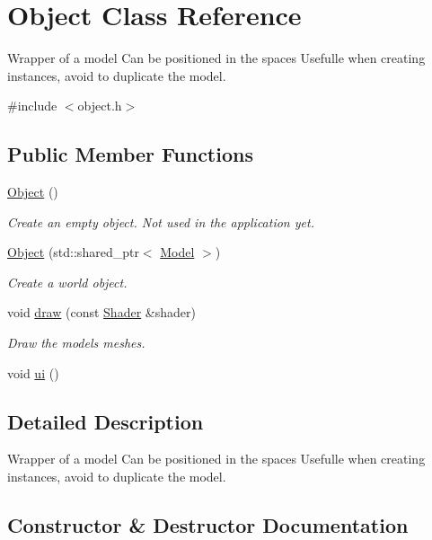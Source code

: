\hypertarget{classObject}{}\section{Object Class Reference}
\label{classObject}


Wrapper of a model Can be positioned in the spaces Usefulle when creating instances, avoid to duplicate the model.  




{\ttfamily \#include $<$object.\+h$>$}

\subsection*{Public Member Functions}
\begin{DoxyCompactItemize}
\item 
\hyperlink{classObject_a40860402e64d8008fb42329df7097cdb}{Object} ()
\begin{DoxyCompactList}\small\item\em Create an empty object. Not used in the application yet. \end{DoxyCompactList}\item 
\hyperlink{classObject_a30ff0733f6b70bc1037d58b927237a0c}{Object} (std\+::shared\+\_\+ptr$<$ \hyperlink{classModel}{Model} $>$)
\begin{DoxyCompactList}\small\item\em Create a world object. \end{DoxyCompactList}\item 
void \hyperlink{classObject_ad9684af664b6b318174bb147d88131fe}{draw} (const \hyperlink{classShader}{Shader} \&shader)
\begin{DoxyCompactList}\small\item\em Draw the model\textquotesingle{}s meshes. \end{DoxyCompactList}\item 
void \hyperlink{classObject_a0a9d6c7d2325fc1eb7e5854151a51d09}{ui} ()
\end{DoxyCompactItemize}


\subsection{Detailed Description}
Wrapper of a model Can be positioned in the spaces Usefulle when creating instances, avoid to duplicate the model. 

\subsection{Constructor \& Destructor Documentation}
\mbox{\label{classObject_a40860402e64d8008fb42329df7097cdb}} 
